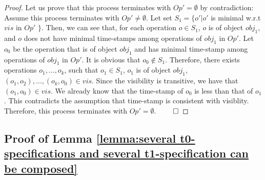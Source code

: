 {\begin {proof}
Let us prove that this process terminates with $\mathit{Op}' = \emptyset$ by contradiction: Assume this process terminates with $\mathit{Op}' \neq \emptyset$. Let set $S_1 = \{ o' \vert o'$ is minimal w.r.t $\mathit{vis}$ in $\mathit{Op}'$ $\}$. Then, we can see that, for each operation $o \in S_1$, $o$ is of object $\mathit{obj}_1$, and $o$ does not have minimal time-stamps among operations of $\mathit{obj}_1$ in $\mathit{Op}'$. Let $o_0$ be the operation that is of object $\mathit{obj}_1$ and has minimal time-stamp among operations of $\mathit{obj}_1$ in $\mathit{Op}'$. It is obvious that $o_0 \notin S_1$. Therefore, there exists operations $o_1,\ldots,o_k$, such that $o_1 \in S_1$, $o_1$ is of object $\mathit{obj}_1$, $(o_1,o_2),\ldots,(o_k,o_0) \in \mathit{vis}$. Since the visibility is transitive, we have that $(o_1,o_0) \in \mathit{vis}$. We already know that the time-stamp of $o_0$ is less than that of $o_1$. This contradicts the assumption that time-stamp is consistent with visiblity. Therefore, this process terminates with $\mathit{Op}' = \emptyset$. $\qed$

\end {proof}






\subsection{Proof of Lemma \ref{lemma:several t0-specifications and several t1-specification can be composed}}
\label{subsec:appendix proofs of lemma several t0-specifications and several t1-specification can be composed}


}
